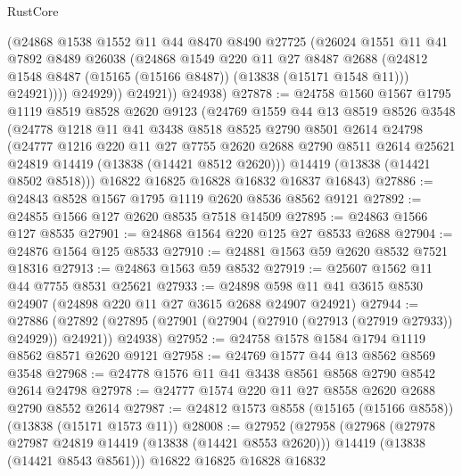 \begin{lexlean}{RustCore}
\begin{coremodule}
                (@24868
                  @1538
                  @1552
                  @11
                  @44
                  @8470
                  @8490
                  @27725
                  (@26024
                    @1551
                    @11
                    @41
                    @7892
                    @8489
                    @26038
                    (@24868
                      @1549
                      @220
                      @11
                      @27
                      @8487
                      @2688
                      (@24812 @1548 @8487 (@15165 (@15166 @8487)) (@13838 (@15171 @1548 @11)))
                      @24921))))
              @24929))
          @24921))
      @24938)
@27878 := @24758
    @1560
    @1567
    @1795
    @1119
    @8519
    @8528
    @2620
    @9123
    (@24769
      @1559
      @44
      @13
      @8519
      @8526
      @3548
      (@24778
        @1218
        @11
        @41
        @3438
        @8518
        @8525
        @2790
        @8501
        @2614
        @24798
        (@24777
          @1216
          @220
          @11
          @27
          @7755
          @2620
          @2688
          @2790
          @8511
          @2614
          @25621
          @24819
          @14419
          (@13838 (@14421 @8512 @2620)))
        @14419
        (@13838 (@14421 @8502 @8518)))
      @16822
      @16825
      @16828
      @16832
      @16837
      @16843)
@27886 := @24843 @8528 @1567 @1795 @1119 @2620 @8536 @8562 @9121
@27892 := @24855 @1566 @127 @2620 @8535 @7518 @14509
@27895 := @24863 @1566 @127 @8535
@27901 := @24868 @1564 @220 @125 @27 @8533 @2688
@27904 := @24876 @1564 @125 @8533
@27910 := @24881 @1563 @59 @2620 @8532 @7521 @18316
@27913 := @24863 @1563 @59 @8532
@27919 := @25607 @1562 @11 @44 @7755 @8531 @25621
@27933 := @24898 @598 @11 @41 @3615 @8530 @24907 (@24898 @220 @11 @27 @3615 @2688 @24907 @24921)
@27944 := @27886
    (@27892 (@27895 (@27901 (@27904 (@27910 (@27913 (@27919 @27933)) @24929)) @24921)) @24938)
@27952 := @24758 @1578 @1584 @1794 @1119 @8562 @8571 @2620 @9121
@27958 := @24769 @1577 @44 @13 @8562 @8569 @3548
@27968 := @24778 @1576 @11 @41 @3438 @8561 @8568 @2790 @8542 @2614 @24798
@27978 := @24777 @1574 @220 @11 @27 @8558 @2620 @2688 @2790 @8552 @2614
@27987 := @24812 @1573 @8558 (@15165 (@15166 @8558)) (@13838 (@15171 @1573 @11))
@28008 := @27952
    (@27958
      (@27968
        (@27978 @27987 @24819 @14419 (@13838 (@14421 @8553 @2620)))
        @14419
        (@13838 (@14421 @8543 @8561)))
      @16822
      @16825
      @16828
      @16832

\end{coremodule}
\end{lexlean}
